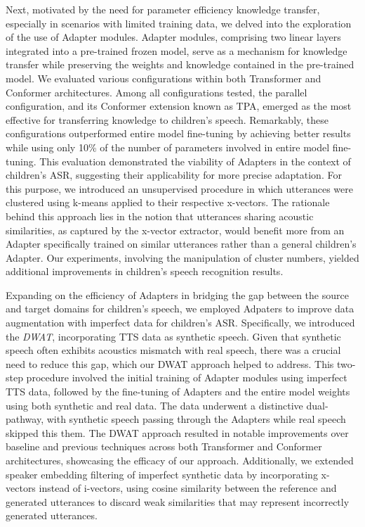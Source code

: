 Next, motivated by the need for parameter efficiency knowledge transfer, especially in scenarios with limited training data, we delved into the exploration of the use of Adapter modules. Adapter modules, comprising two linear layers integrated into a pre-trained frozen model, serve as a mechanism for knowledge transfer while preserving the weights and knowledge contained in the pre-trained model. We evaluated various configurations within both Transformer and Conformer architectures. Among all configurations tested, the parallel configuration, and its Conformer extension known as \ac{TPA}, emerged as the most effective for transferring knowledge to children's speech. Remarkably, these configurations outperformed entire model fine-tuning by achieving better results while using only 10\% of the number of parameters involved in entire model fine-tuning. This evaluation demonstrated the viability of Adapters in the context of children's \ac{ASR}, suggesting their applicability for more precise adaptation. For this purpose, we introduced an unsupervised procedure in which utterances were clustered using k-means applied to their respective x-vectors. The rationale behind this approach lies in the notion that utterances sharing acoustic similarities, as captured by the x-vector extractor, would benefit more from an Adapter specifically trained on similar utterances rather than a general children's Adapter. Our experiments, involving the manipulation of cluster numbers, yielded additional improvements in children's speech recognition results.

Expanding on the efficiency of Adapters in bridging the gap between the source and target domains for children's speech, we employed Adpaters to improve data augmentation with imperfect data for children's \ac{ASR}. Specifically, we introduced the \textit{\ac{DWAT}}, incorporating \ac{TTS} data as synthetic speech. Given that synthetic speech often exhibits acoustics mismatch with real speech, there was a crucial need to reduce this gap, which our \ac{DWAT} approach helped to address. This two-step procedure involved the initial training of Adapter modules using imperfect \ac{TTS} data, followed by the fine-tuning of Adapters and the entire model weights using both synthetic and real data. The data underwent a distinctive dual-pathway, with synthetic speech passing through the Adapters while real speech skipped this them. The \ac{DWAT} approach resulted in notable improvements over baseline and previous techniques across both Transformer and Conformer architectures, showcasing the efficacy of our approach. Additionally, we extended speaker embedding filtering of imperfect synthetic data by incorporating x-vectors instead of i-vectors, using cosine similarity between the reference and generated utterances to discard weak similarities that may represent incorrectly generated utterances.

